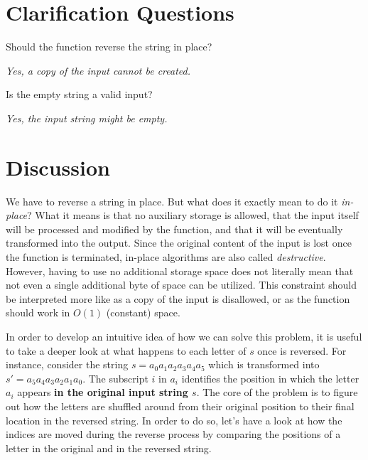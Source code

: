 \section{Clarification Questions}

\begin{QandA}
	\item \begin{questionitem} \begin{question} Should the function reverse the string in place?  \end{question} 	 
    \begin{answered}
		\textit{Yes, a copy of the input cannot be created.}
	\end{answered} \end{questionitem}

	\item \begin{questionitem} \begin{question} Is the empty string a valid input?  \end{question} 	 
    \begin{answered}
		\textit{Yes, the input string might be empty.}
	\end{answered} \end{questionitem}
	
\end{QandA}

\section{Discussion}
\label{string_reverse:sec:discussion}
We have to reverse a string in place. But what does it exactly mean to do it
\textit{in-place}? 
What it means is that no auxiliary storage is allowed, that the input itself will be processed and modified by the function, and that it will be eventually transformed into the output.
Since the original content of the input is lost once the function is terminated, in-place algorithms are also called \textit{destructive}.
However, having to use no additional storage space does not literally mean that not even a single additional byte of space can be utilized.
This constraint should be interpreted more like as a copy of the input is disallowed, or as the function should work in $O(1)$ (constant) space.

In order to develop an intuitive idea of how we can solve this problem, it is useful to take a deeper look at what happens to each letter of $s$ once is reversed.
For instance, consider the string $s=a_0 a_1 a_2 a_3 a_4 a_5$ which is transformed into $s'=a_5 a_4 a_3 a_2 a_1 a_0$.
The subscript $i$ in $a_i$ identifies the position in which the letter $a_i$ appears \textbf{in the original input string $s$}. 
The core of the problem is to figure out how the letters are shuffled around from their original position to their final location in the reversed string.
In order to do so, let's have a look at how the indices are moved during the reverse process by comparing the positions of a letter in the original and in the reversed string.

